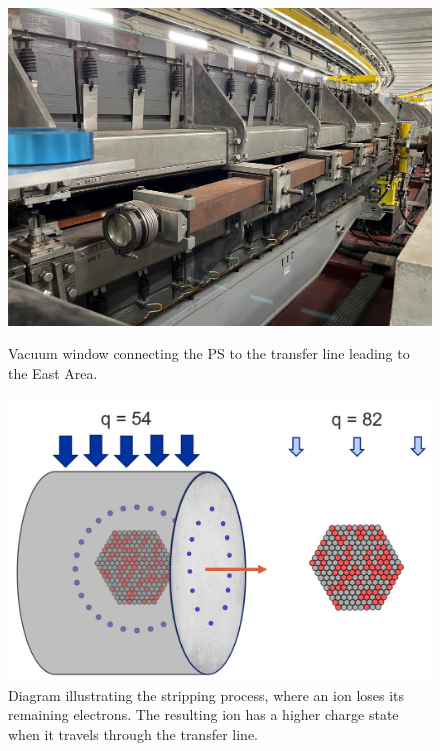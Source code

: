 \documentclass{cernatsnote}
\begin{document}
\begin{figure}
    \centering
    \begin{minipage}{0.45\textwidth}
        \centering
        \includegraphics[width=1.0\textwidth]{images/PS_BEAM_ENERGY/vaccum_window.jpg}
        \caption{Vacuum window connecting the PS to the transfer line leading to the East Area.}
        \label{fig:vaccum window}
    \end{minipage}\hfill
    \begin{minipage}{0.45\textwidth}
        \centering
        \includegraphics[width=1.0\textwidth]{images/PS_BEAM_ENERGY/stripping.jpg} 
        \caption{Diagram illustrating the stripping process, where an ion loses its remaining electrons. The resulting ion has a higher charge state when it travels through the transfer line.}
        \label{fig:stripping}
    \end{minipage}
\end{figure}
\end{document}
